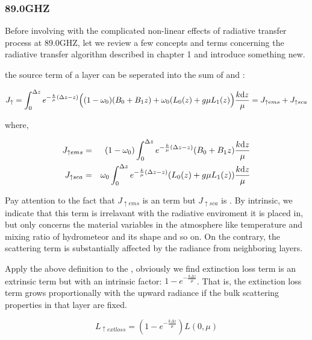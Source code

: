 \clearpage

\subsubsection{89.0GHZ}

Before involving with the complicated non-linear effects of radiative transfer process at 89.0GHZ, let we review 
a few concepts and terms concerning the radiative transfer algorithm described in chapter 1 and introduce something new.

the source term of a layer can be seperated into the sum of  and :

\begin{equation} \label{eq:seperatesourceterm} 
    J_{\uparrow} = \int_{0}^{\Delta z}
    e^{-\frac{k}{\mu}(\Delta z - z)}
    \Big(
        (1-\omega_{0})(B_{0}+B_{1}z) + \omega_{0}(L_{0}(z) + g\mu L_{1}(z)
    \Big)
    \frac{k\mathrm{d} z}{\mu} 
    = J_{\uparrow ems} + J_{\uparrow sca} 
\end{equation}

where,

\begin{eqnarray} \label{eq:emsandscaexpression}
J_{\uparrow ems} & = & (1-\omega_{0})\int_{0}^{\Delta z}
e^{-\frac{k}{\mu}(\Delta z - z)}
    (B_{0}+B_{1}z)
\frac{k\mathrm{d} z}{\mu} \nonumber\\
J_{\uparrow sca} & = & \omega_{0}\int_{0}^{\Delta z}
e^{-\frac{k}{\mu}(\Delta z - z)}
(L_{0}(z) + g\mu L_{1}(z))
\frac{k\mathrm{d} z}{\mu}
\end{eqnarray}

Pay attention to the fact that $J_{\uparrow ems}$ is an  term but $J_{\uparrow sca}$ is .
By intrinsic, we indicate that this term is irrelavant with the radiative enviroment it is placed in, but only concerns
the material variables in the atmosphere like temperature and mixing ratio of hydrometeor and its shape and so on.
On the contrary, the scattering term is substantially affected by the radiance from neighboring layers.

Apply the above definition to the , obviously we find extinction loss term is an extrinsic term but with
an intrinsic factor: $1 - e^{-\frac{k\Delta z}{\mu}}$. That is, the extinction loss term grows proportionally with the upward radiance if
the bulk scattering properties in that layer are fixed.

\begin{equation} \label{eq:extlossterm}
L_{\uparrow extloss} = (1 - e^{-\frac{k\Delta z}{\mu}})L(0, \mu)
\end{equation} 

